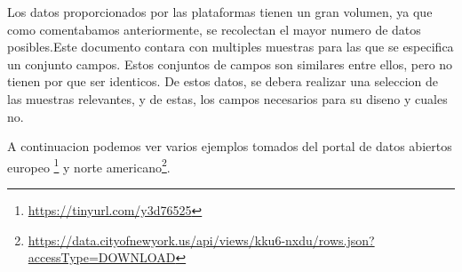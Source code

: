 Los datos proporcionados por las plataformas tienen un gran volumen, ya que como comentabamos anteriormente, se recolectan
el mayor numero de datos posibles.Este documento contara con multiples muestras para las que
se especifica un conjunto campos. Estos conjuntos de campos son similares entre ellos, pero no tienen por que ser identicos. 
De estos datos, se debera realizar una seleccion de las muestras relevantes, y de estas, los campos necesarios
para su diseno y cuales no.
\newpage
\begin{comment}
\begin{figure}[h]
\centering
\framebox{
\vbox{\begin{tabbing} 
Document \\
\hspace*{5mm} \= Sample 1 \\
\hspace*{10mm}\textit{Field A:} \hspace*{5mm} \= value A \\
\hspace*{10mm}\textit{Field B:} \hspace*{5mm} \= value B \\
\hspace*{5mm} \= Sample 2 \\
\hspace*{10mm}\textit{Field A:} \hspace*{5mm} \= value A \\
\hspace*{10mm}\textit{Field C:} \hspace*{5mm} \= value C \\
\hspace*{10mm}\textit{Field D:} \hspace*{5mm} \= value D \\
\hspace*{5mm} \= ... 
\hspace*{5mm} \= Sample n \\
\hspace*{10mm} \= ... 
\end{tabbing}}%
}
\caption{Ejemplo documento de la fuente de origen}
\end{figure}
\end{comment}
A continuacion podemos ver varios ejemplos tomados del portal de datos abiertos europeo
\footnote{\url{https://tinyurl.com/y3d76525}} 
y norte americano\footnote{\url{https://data.cityofnewyork.us/api/views/kku6-nxdu/rows.json?accessType=DOWNLOAD}}.

